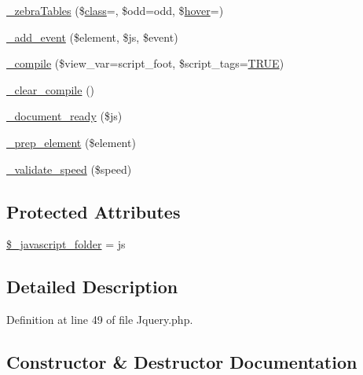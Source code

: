 \begin{DoxyCompactItemize}
\item 
\mbox{\hyperlink{class_c_i___jquery_ac3aee12f47604782c9999a511d3ea4e5}{\+\_\+zebra\+Tables}} (\$\mbox{\hyperlink{waiter_2olaporan_8php_a185c73c6507391d1eb38c776b68ce96d}{class}}=\textquotesingle{}\textquotesingle{}, \$odd=\textquotesingle{}odd\textquotesingle{}, \$\mbox{\hyperlink{class_c_i___javascript_a6f8cfdbca8f6b2c2d68bb9a38a8f96a7}{hover}}=\textquotesingle{}\textquotesingle{})
\item 
\mbox{\hyperlink{class_c_i___jquery_acb1530e106b7717d7c031dcb082a0da8}{\+\_\+add\+\_\+event}} (\$element, \$js, \$event)
\item 
\mbox{\hyperlink{class_c_i___jquery_a32374487ab27bcad0bee1bf18a6e6b7a}{\+\_\+compile}} (\$view\+\_\+var=\textquotesingle{}script\+\_\+foot\textquotesingle{}, \$script\+\_\+tags=\mbox{\hyperlink{constants_8php_ae04a3efe6aa42044f803ee90c2277846}{T\+R\+UE}})
\item 
\mbox{\hyperlink{class_c_i___jquery_a8508147ee3b37f58e7c58f365c6c1409}{\+\_\+clear\+\_\+compile}} ()
\item 
\mbox{\hyperlink{class_c_i___jquery_a5d111acaf02096fa67c90954167c202f}{\+\_\+document\+\_\+ready}} (\$js)
\item 
\mbox{\hyperlink{class_c_i___jquery_a6dd4fcc0640975784e69d1ea11eba291}{\+\_\+prep\+\_\+element}} (\$element)
\item 
\mbox{\hyperlink{class_c_i___jquery_aea8d69840297d111305f7b5ff9982573}{\+\_\+validate\+\_\+speed}} (\$speed)
\end{DoxyCompactItemize}
\subsection*{Protected Attributes}
\begin{DoxyCompactItemize}
\item 
\mbox{\hyperlink{class_c_i___jquery_a078b6ad01e6de9b28c6ff3afa31c55db}{\$\+\_\+javascript\+\_\+folder}} = \textquotesingle{}js\textquotesingle{}
\end{DoxyCompactItemize}


\subsection{Detailed Description}


Definition at line 49 of file Jquery.\+php.



\subsection{Constructor \& Destructor Documentation}
\mbox{\label{class_c_i___jquery_a9162320adff1a1a4afd7f2372f753a3e}} 
